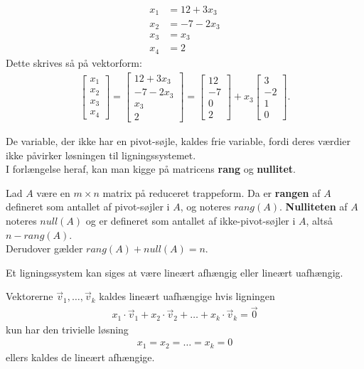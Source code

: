 \begin{eks}
\begin{align*}
x_1 &= 12 + 3x_3 \\
x_2 &= -7 - 2x_3 \\
x_3 &= x_3 \\
x_4 &= 2
\end{align*}
Dette skrives så på vektorform:
\begin{align*}
\begin{bmatrix}
x_1 \\
x_2 \\
x_3 \\
x_4 
\end{bmatrix}
= \begin{bmatrix}
12 + 3x_3 \\
-7 - 2x_3 \\
x_3 \\
2
\end{bmatrix}
= \begin{bmatrix}
12 \\
-7 \\
0 \\
2
\end{bmatrix}
+ x_3 \begin{bmatrix}
3 \\
-2 \\
1 \\
0
\end{bmatrix}.
\end{align*}
\end{eks}

De variable, der ikke har en pivot-søjle, kaldes frie variable, fordi deres værdier ikke påvirker løsningen til ligningssystemet. \\

I forlængelse heraf, kan man kigge på matricens \textbf{rang} og \textbf{nullitet}. 
\begin{defn}
Lad $A$ være en $m \times n$ matrix på reduceret trappeform. 
Da er \textbf{rangen} af $A$ defineret som antallet af pivot-søjler i $A$, og noteres $rang(A)$. 
\textbf{Nulliteten} af $A$ noteres $null(A)$ og er defineret som antallet af ikke-pivot-søjler i $A$, altså $n - rang(A)$. \\
Derudover gælder $rang(A) + null(A) = n$.
\end{defn}


Et ligningssystem kan siges at være lineært afhængig eller lineært uafhængig.

\begin{defn}
Vektorerne $\vec{v}_1, \dots ,\vec{v}_k$ kaldes lineært uafhængige hvis ligningen
\begin{align*}
x_1 \cdot \vec{v}_1+x_2 \cdot \vec{v}_2 + \dots + x_k \cdot \vec{v}_k =  \vec{0}
\end{align*}
kun har den trivielle løsning
\begin{align*}
x_1=x_2= \dots =x_k=0
\end{align*}
ellers kaldes de lineært afhængige.
\label{defn_lin_uafh}
\end{defn}

